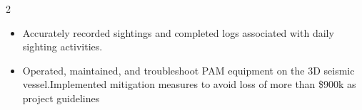 \documentclass[10pt,a4paper,ragged2e,withhyper]{altacv}
\begin{document}
\begin{paracol}{2}
\begin{itemize}
\end{itemize}
\divider


\begin{itemize}

\item Accurately recorded sightings and completed logs associated with daily sighting activities.
\item Operated, maintained, and troubleshoot PAM equipment on the 3D seismic vessel.Implemented  mitigation measures to avoid loss of more than \$900k as project guidelines

\end{itemize}


\end{paracol}
\end{document}

